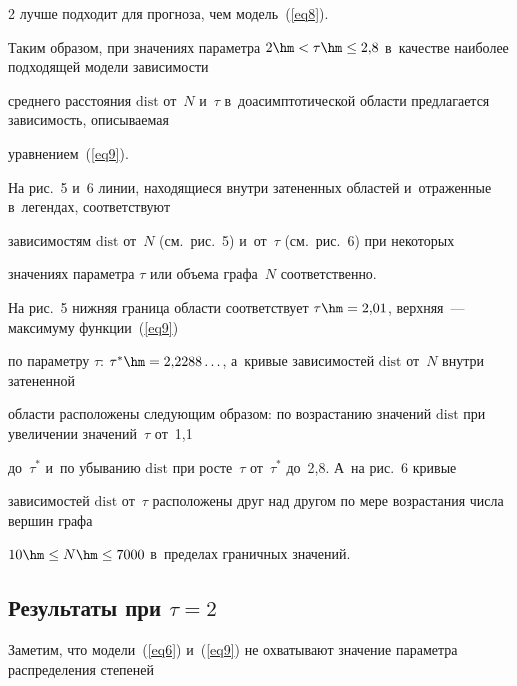 \begin{multicols}{2}
лучше подходит для прогноза, чем модель~(\ref{eq8}).

Таким образом, при значениях па\-ра\-мет\-ра $2\hm<\tau\hm\leq 2{,}8$ в~качестве наиболее подходящей модели за\-ви\-си\-мости

среднего рас\-сто\-яния $\mathrm{dist}$ от~$N$ и~$\tau$ в~до\-асимп\-то\-ти\-че\-ской об\-ласти предлагается за\-ви\-си\-мость, опи\-сы\-ва\-емая

уравнением~(\ref{eq9}).







На рис.~5 и~6 линии, находящиеся внут\-ри затененных областей и~отраженные в~легендах, соответствуют

зависимостям $\mathrm{dist}$ от~$N$ (см.\ рис.~5) и~от~$\tau$ (см.\ рис.~6) при некоторых

значениях па\-ра\-мет\-ра $\tau$ или объема графа~$N$ соответственно.

На рис.~5 ниж\-няя граница об\-ласти соответствует $\tau\hm=2{,}01$, верхняя~--- максимуму функции~(\ref{eq9}) 

по параметру $\tau$: $\tau^*\hm=2{,}2288\ldots$, а~кривые зависимостей $\mathrm{dist}$ от~$N$ внут\-ри затененной

об\-ласти расположены сле\-ду\-ющим образом: по воз\-рас\-та\-нию значений $\mathrm{dist}$ при увеличении значений~$\tau$ от~1,1

до~$\tau^*$ и~по убыванию $\mathrm{dist}$ при рос\-те~$\tau$ от~$\tau^*$ до~2,8. А~на рис.~6 кривые

зависимостей $\mathrm{dist}$ от~$\tau$ расположены друг над другом по мере воз\-рас\-та\-ния чис\-ла вершин графа

$10\hm\leq N\hm\leq 7000$ в~пределах граничных значений.



\vspace*{-9pt}





\subsection{Результаты при $\tau=2$}



\vspace*{-2pt}



Заметим, что модели~(\ref{eq6}) и~(\ref{eq9}) не охватывают значение па\-ра\-мет\-ра распределения степеней


\end{multicols}
